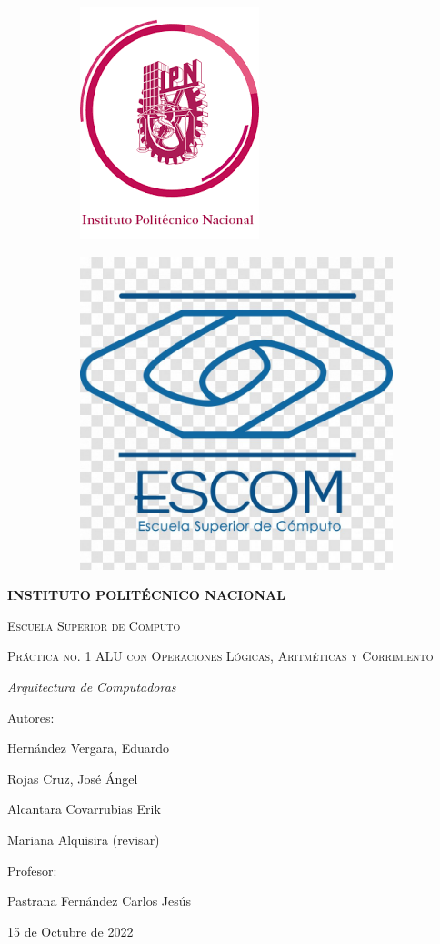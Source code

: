 	\begin{titlepage}
		\begin{figure}[!h]
			\begin{subfigure}{0.5\textwidth}
				\includegraphics[width=0.2\linewidth, inner]{logoIPN}
			\end{subfigure}
			\begin{subfigure}{0.5\textwidth}
				\includegraphics[width=0.2\linewidth, right]{logoESCOM}
			\end{subfigure}	
				
		\end{figure}		
		\centering
		\vspace{1cm}
		{\bfseries\LARGE INSTITUTO POLIT\'ECNICO NACIONAL \par}
		\vspace{1cm}
		{\scshape\Large Escuela Superior de Computo \par}
		\vspace{3cm}
		{\scshape\Huge Pr\'actica no. 1 ALU con Operaciones L\'ogicas, Aritm\'eticas y Corrimiento\par}
		\vspace{3cm}
		{\itshape\Large Arquitectura de Computadoras \par}
		\vfill
		{\Large Autores: \par}
		{\Large Hern\'andez Vergara, Eduardo \par}
		{\Large Rojas Cruz, Jos\'e \'Angel \par}
		{\Large Alcantara Covarrubias Erik \par}
		{\Large Mariana Alquisira (revisar) \par}
		\vfill
		{\Large Profesor: \par}
		{\Large Pastrana Fern\'andez Carlos Jes\'us \par}
		\vfill
		{\Large 15 de Octubre de 2022 \par}
	\end{titlepage}
